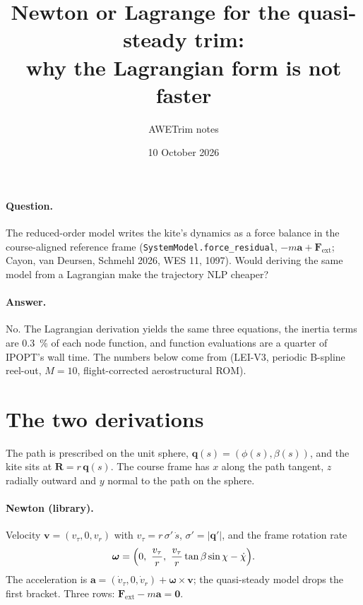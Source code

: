 \documentclass[11pt,a4paper]{article}
\title{Newton or Lagrange for the quasi-steady trim:\\ why the Lagrangian form is not faster}
\author{AWETrim notes}
\date{10 October 2026}
\newcommand{\code}[1]{\texttt{#1}}
\newcommand{\vect}[1]{\boldsymbol{#1}}
\begin{document}
\maketitle

\paragraph{Question.} The reduced-order model writes the kite's dynamics as a
force balance in the course-aligned reference frame
(\code{SystemModel.force\_residual}, $-m\vect a + \vect F_\mathrm{ext}$; Cayon,
van Deursen, Schmehl 2026, WES 11, 1097). Would deriving the same model from a
Lagrangian make the trajectory NLP cheaper?

\paragraph{Answer.} No. The Lagrangian derivation yields the same three
equations, the inertia terms are \SI{0.3}{\percent} of each node function, and
function evaluations are a quarter of IPOPT's wall time. The numbers below come
from 
(LEI-V3, periodic B-spline reel-out, $M=10$, flight-corrected aerostructural
ROM).

\section{The two derivations}

The path is prescribed on the unit sphere, $\vect q(s) = (\phi(s), \beta(s))$,
and the kite sits at $\vect R = r\,\vect q(s)$. The course frame has $x$ along
the path tangent, $z$ radially outward and $y$ normal to the path on the sphere.

\paragraph{Newton (library).} Velocity $\vect v = (v_\tau, 0, v_r)$ with
$v_\tau = r\,\sigma'\,\dot s$, $\sigma' = |\vect q'|$, and the frame rotation
rate
\begin{equation}
  \vect\omega = \Bigl(0,\ \frac{v_\tau}{r},\ \frac{v_\tau}{r}\tan\beta\sin\chi - \dot\chi\Bigr).
\end{equation}
The acceleration is $\vect a = (\dot v_\tau, 0, \dot v_r) + \vect\omega\times\vect v$;
the quasi-steady model drops the first bracket. Three rows:
$\vect F_\mathrm{ext} - m\vect a = \vect 0$.
\end{document}
